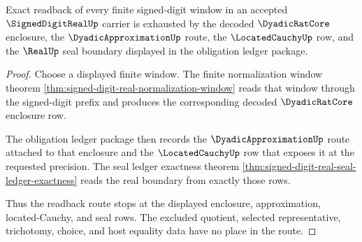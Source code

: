 \begin{theorem}
\label{thm:signed-digit-real-exact-readback-boundary}
Exact readback of every finite signed-digit window in an accepted
$\SignedDigitRealUp$ carrier is exhausted by the decoded $\DyadicRatCore$
enclosure, the $\DyadicApproximationUp$ route, the $\LocatedCauchyUp$ row, and
the $\RealUp$ seal boundary displayed in the obligation ledger package.
\end{theorem}
\begin{proof}
Choose a displayed finite window. The finite normalization window theorem
\autoref{thm:signed-digit-real-normalization-window} reads that window through
the signed-digit prefix and produces the corresponding decoded
$\DyadicRatCore$ enclosure row.

The obligation ledger package then records the $\DyadicApproximationUp$ route
attached to that enclosure and the $\LocatedCauchyUp$ row that exposes it at the
requested precision. The seal ledger exactness theorem
\autoref{thm:signed-digit-real-seal-ledger-exactness} reads the real boundary
from exactly those rows.

Thus the readback route stops at the displayed enclosure, approximation,
located-Cauchy, and seal rows. The excluded quotient, selected representative,
trichotomy, choice, and host equality data have no place in the route.
\end{proof}

